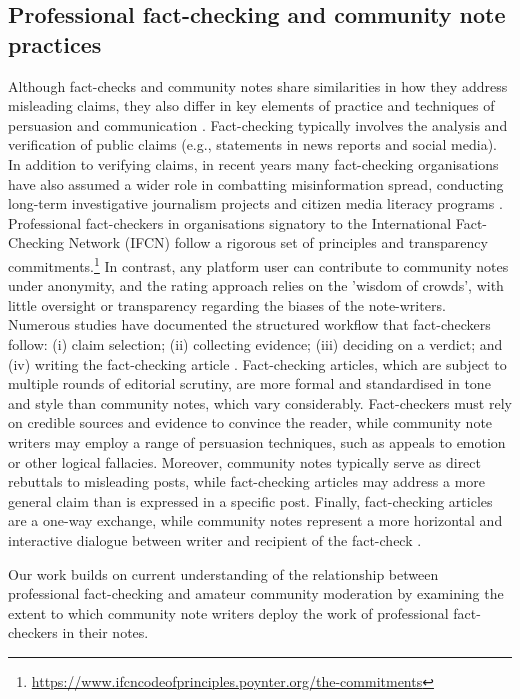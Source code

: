 \subsection{Professional fact-checking and community note practices}
Although fact-checks and community notes share similarities in how they address misleading claims, they also differ in key elements of practice and techniques of persuasion and communication  \citep{kankham_community_2024}.
Fact-checking typically involves the analysis and verification of public claims (e.g., statements in news reports and social media). In addition to verifying claims, in recent years many fact-checking organisations have also assumed a wider role in combatting misinformation spread, conducting long-term investigative journalism projects and citizen media literacy programs \citep{juneja2022human}.
Professional fact-checkers in organisations signatory to the International Fact-Checking Network (IFCN) follow a rigorous set of principles and transparency commitments.\footnote{\url{https://www.ifcncodeofprinciples.poynter.org/the-commitments}}
In contrast, any platform user can contribute to community notes under anonymity, and the rating approach relies on the 'wisdom of crowds', with little oversight or transparency regarding the biases of the note-writers.
Numerous studies have documented the structured workflow that fact-checkers follow: (i) claim selection; (ii) collecting evidence; (iii) deciding on a verdict; and (iv) writing the fact-checking article \citep{graves2017anatomy,micallef2022true,warren2025explainablefactchecking}.
Fact-checking articles, which are subject to multiple rounds of editorial scrutiny, are more formal and standardised in tone and style than community notes, which vary considerably.
Fact-checkers must rely on credible sources and evidence to convince the reader, while community note writers may employ a range of persuasion techniques, such as appeals to emotion or other logical fallacies.
Moreover, community notes typically serve as direct rebuttals to misleading posts, while fact-checking articles may address a more general claim than is expressed in a specific post.
Finally, fact-checking articles are a one-way exchange, while community notes represent a more horizontal and interactive dialogue between writer and recipient of the fact-check \citep{kankham_community_2024}.

Our work builds on current understanding of the relationship between professional fact-checking and amateur community moderation by examining the extent to which community note writers deploy the work of professional fact-checkers in their notes.






